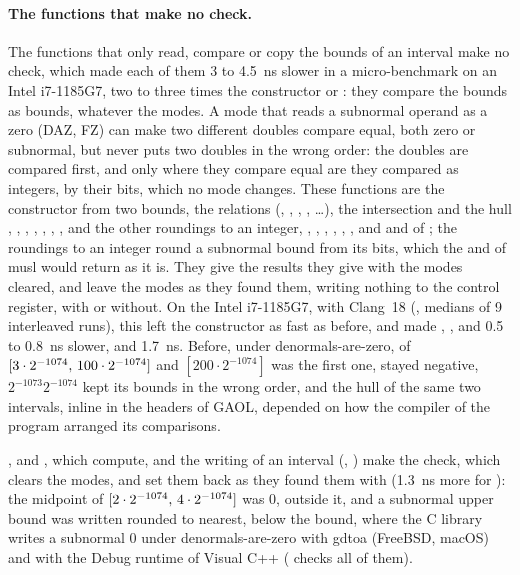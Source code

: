 \medskip
\paragraph{The functions that make no check.} The functions that only read,
compare or copy the bounds of an interval make no check, which made each of
them 3 to 4.5~ns slower in a micro-benchmark on an Intel i7-1185G7, two to
three times the constructor or : they compare the
bounds as bounds, whatever the modes.\newinvfive{} A mode that reads a
subnormal operand as a zero (DAZ, FZ) can make two different doubles compare
equal, both zero or subnormal, but never puts two doubles in the wrong order:
the doubles are compared first, and only where they compare equal are they
compared as integers, by their bits, which no mode changes. These functions
are the constructor from two bounds, the relations (,
, , ,
\dots), the intersection \code{\&} and the hull
\code{|}, , , , ,
, ,  and the other roundings to an
integer, , , ,
, , , and
 and  of ; the roundings to an
integer round a subnormal bound from its bits, which the  and
 of musl would return as it is. They give the results they give
with the modes cleared, and leave the modes as they found them, writing
nothing to the control register, with  or
without. On the Intel i7-1185G7, with Clang~18 (,
medians of 9 interleaved runs), this left the constructor as fast as before,
and made , ,  and
 0.5 to 0.8~ns slower, and  1.7~ns. Before, under
denormals-are-zero,  of
$[3\cdot2^{-1074},\,100\cdot2^{-1074}]$ and $[200\cdot2^{-1074}]$ was the
first one,  stayed negative,
$2^{-1073}$\code{, }$2^{-1074}$\code{)} kept its bounds in
the wrong order, and the hull \code{|} of the same two intervals, inline in
the headers of GAOL, depended on how the compiler of the program arranged its
comparisons.

\medskip
{},  and , which compute, and the
writing of an interval (, ) make
the check, which clears the modes, and set them back as they found them with
 (1.3~ns more for ): the
midpoint of $[2\cdot2^{-1074},\,4\cdot2^{-1074}]$ was 0, outside it, and
a subnormal upper bound was written rounded to nearest, below the bound,
where the C library writes a subnormal 0 under denormals-are-zero with gdtoa
(FreeBSD, macOS) and with the Debug runtime of Visual C++
( checks all of them).

